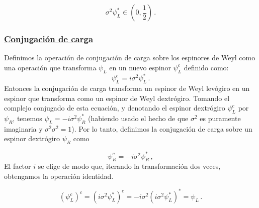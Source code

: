 \documentclass[a4paper,11pt]{book} %
\begin{document}
\begin{equation}
\sigma^2 \psi_L^* \in \left( 0, \frac{1}{2} \right) \, .
\end{equation}
\subsubsection*{\underline{Conjugación de carga}}
\noindent
Definimos la operación de conjugación de carga sobre los espinores de Weyl como
una operación que transforma $\psi_L$ en un nuevo espinor $\psi_L^c$ definido como:
\begin{equation}
\psi_L^c = i\sigma^2 \psi_L^* \, .
\end{equation}
 \noindent
Entonces la conjugación de carga transforma un espinor de Weyl levógiro en un espinor que transforma como un espinor de Weyl
dextrógiro. 
\medskip\newline
Tomando el complejo conjugado de esta ecuación, y denotando el espinor
dextrógiro $\psi_L^c$ por $\psi_R$, tenemos $\psi_L = -i\sigma^2 \psi_R^*$
(habiendo usado el hecho de que $\sigma^2$ es puramente imaginaria y
$\sigma^2 \sigma^2 = 1$). Por lo tanto, definimos la conjugación de carga sobre un
espinor dextrógiro $\psi_R$ como
 
\begin{equation}
\psi_R^c = -i\sigma^2 \psi_R^* \, ,
\end{equation}
\noindent
El factor $i$ se elige de modo que, iterando la
transformación dos veces, obtengamos la operación identidad.
 
\begin{equation}
(\psi_L^c)^c = (i\sigma^2 \psi_L^*)^c
= -i\sigma^2 (i\sigma^2 \psi_L^*)^* = \psi_L \, .
\end{equation}
\end{document}
